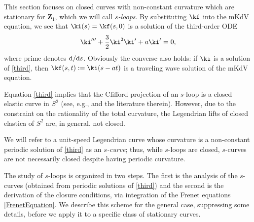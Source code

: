 \documentclass[10pt,a4paper]{amsart}
\newcommand\VZ{\mathbf Z}
\numberwithin{equation}{section}
\begin{document}
This section focuses on closed curves with non-constant curvature which are stationary for $\VZ_1$, which we will call {\it $s$-loops}. By substituting $\kf$ into the mKdV equation, we see that $\ki(s)=\kf(s,0)$ is a solution of the third-order ODE
\begin{equation}\label{third}
\ki'''+\frac{3}{2}\ki^2\ki'+a \ki' = 0,\end{equation}
where prime denotes ${\rm d}/{\rm d}s$. Obviously the converse also holds: if $\ki$ is a solution of \eqref{third}, then $\kf(s,t):=\ki(s-at)$ is a traveling wave solution of the mKdV equation.

\begin{Remark} Equation \eqref{third} implies that the Clifford projection of an $s$-loop is a closed elastic curve in $S^2$ (see, e.g., \cite{He} and the literature therein). However, due to the constraint on the rationality of the total curvature, the Legendrian lifts of closed elastica of $S^2$ are, in general, not closed.
\end{Remark}

We will refer to a unit-speed Legendrian curve whose curvature is a non-constant periodic solution of \eqref{third} as an {\it $s$-curve}; thus, while $s$-loops are closed, $s$-curves are not necessarily closed despite having periodic curvature.

The study of $s$-loops is organized in two steps. The first is the analysis of the $s$-curves (obtained from periodic solutions of \eqref{third}) and the second is the derivation of the closure conditions, via integration of the Frenet equations \eqref{FrenetEquation}. We describe this scheme for the general case, suppressing some details, before we apply it to a specific class of stationary curves.
\end{document}
